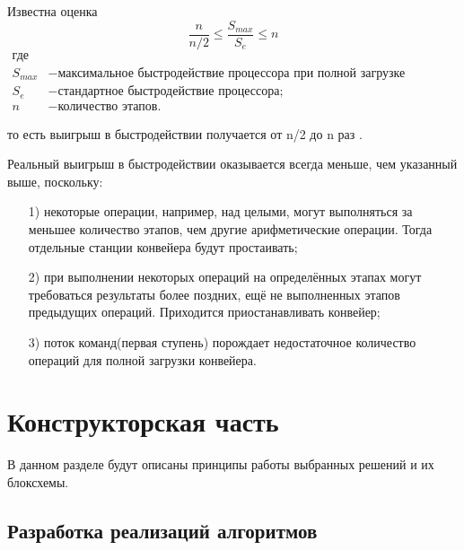 \documentclass[a4paper, 14pt]{article}
\begin{document}
Известна оценка
\begin{equation}\label{form:way} 
{\frac{n}{n/2} \leq {\frac{S_{max}}{S_{e}}} \leq n}
 \end{equation}
 \begin{align*}
    \text{где} \\
    S_{max} &- \text{максимальное быстродействие процессора  при полной загрузке конвейера;} \\
    S_{e} &- \text{стандартное быстродействие процессора;} \\
   n &- \text{количество этапов.}
\end{align*}

то есть выигрыш в быстродействии получается от n/2  до n раз \cite{conveyor_mark}.

Реальный выигрыш в быстродействии оказывается всегда меньше, чем указанный выше, поскольку:

\begin{enumerate}
\item[1)] некоторые операции, например, над целыми, могут выполняться за меньшее количество этапов, чем другие арифметические операции. Тогда отдельные станции конвейера будут простаивать;
\item[2)] при выполнении некоторых операций на определённых этапах могут требоваться результаты более поздних, ещё не выполненных этапов предыдущих операций. Приходится приостанавливать конвейер;
\item[3)] поток команд(первая ступень) порождает недостаточное количество операций для полной загрузки конвейера.
\end{enumerate}
	
		\newpage
	\section{Конструкторская часть}
	\hspace{1cm}В данном разделе будут описаны принципы работы выбранных решений и их блоксхемы.
	\subsection{Разработка реализаций алгоритмов}
	
\end{document}
